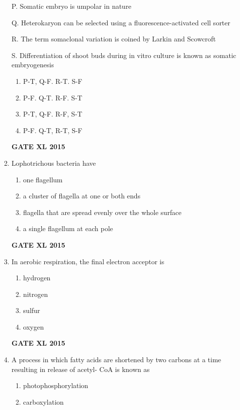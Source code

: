 \documentclass[journal,12pt,onecolumn]{IEEEtran}
\begin{document}
\begin{enumerate}
P. Somatic embryo is umpolar in nature

Q. Heterokaryon can be selected using a fluorescence-activated cell sorter 

R. The term somaclonal variation is coined by Larkin and Scowcroft

S. Differentiation of shoot buds during in vitro culture is known as somatic embryogenesis
    \begin{enumerate}
            \item  P-T, Q-F. R-T. S-F
	    \item  P-F. Q-T. R-F. S-T
	    \item P-T, Q-F. R-F, S-T
            \item P-F. Q-T, R-T, S-F
    \end{enumerate}
\begin{flushright}\textbf{GATE XL 2015}\end{flushright}
\item Lophotrichous bacteria have
    \begin{enumerate}
            \item one flagellum
	    \item a cluster of flagella at one or both ends
	    \item flagella that are spread evenly over the whole surface
            \item a single flagellum at each pole
    \end{enumerate}
\begin{flushright}\textbf{GATE XL 2015}\end{flushright}
\item In aerobic respiration, the final electron acceptor is
    \begin{enumerate}
            \item hydrogen
	    \item nitrogen
	    \item sulfur
            \item oxygen
    \end{enumerate}
\begin{flushright}\textbf{GATE XL 2015}\end{flushright}
\item A process in which fatty acids are shortened by two carbons at a time resulting in release of acetyl-
CoA is known as
    \begin{enumerate}
            \item photophosphorylation
	    \item carboxylation

\end{enumerate}
\end{enumerate}
\end{document}
